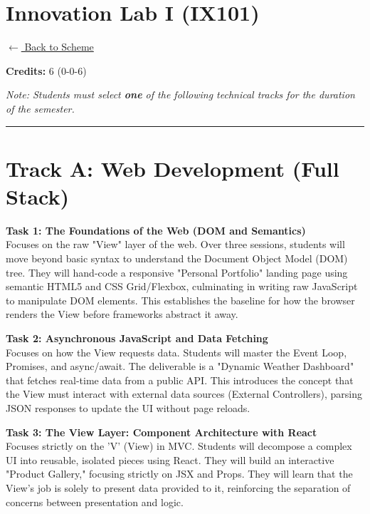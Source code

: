 \section*{Innovation Lab I (IX101)}
\label{course:IX101}

\noindent \small{\hyperref[main:scheme]{$\leftarrow$ Back to Scheme}} \vspace{0.5cm}

\noindent \textbf{Credits:} 6 (0-0-6)

\noindent \textit{Note: Students must select \textbf{one} of the following technical tracks for the duration of the semester.}

\vspace{0.5cm}
\hrule
\vspace{0.5cm}

\section*{Track A: Web Development (Full Stack)}

\noindent\textbf{Task 1: The Foundations of the Web (DOM and Semantics)} \\
Focuses on the raw "View" layer of the web. Over three sessions, students will move beyond basic syntax to understand the Document Object Model (DOM) tree. They will hand-code a responsive "Personal Portfolio" landing page using semantic HTML5 and CSS Grid/Flexbox, culminating in writing raw JavaScript to manipulate DOM elements. This establishes the baseline for how the browser renders the View before frameworks abstract it away.

\vspace{0.3cm}

\noindent\textbf{Task 2: Asynchronous JavaScript and Data Fetching} \\
Focuses on how the View requests data. Students will master the Event Loop, Promises, and async/await. The deliverable is a "Dynamic Weather Dashboard" that fetches real-time data from a public API. This introduces the concept that the View must interact with external data sources (External Controllers), parsing JSON responses to update the UI without page reloads.

\vspace{0.3cm}

\noindent\textbf{Task 3: The View Layer: Component Architecture with React} \\
Focuses strictly on the 'V' (View) in MVC. Students will decompose a complex UI into reusable, isolated pieces using React. They will build an interactive "Product Gallery," focusing strictly on JSX and Props. They will learn that the View’s job is solely to present data provided to it, reinforcing the separation of concerns between presentation and logic.

